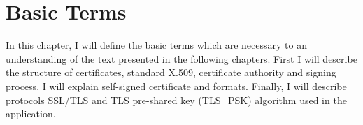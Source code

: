 \documentclass[
  twoside, 12pt, 
  printed, %
  notable,   %
  lof,     %
  lot,     %
]{fithesis3}
\begin{document}
\chapter{Basic Terms}
In this chapter, I will define the basic terms which are necessary to an understanding of the 
text presented in the following chapters. First I will describe the structure of certificates, 
standard X.509, certificate authority and signing process. I will explain self-signed certificate and formats. Finally, I will describe protocols SSL/TLS and TLS pre-shared key (TLS\_PSK) 
algorithm used in the application.

\end{document}
